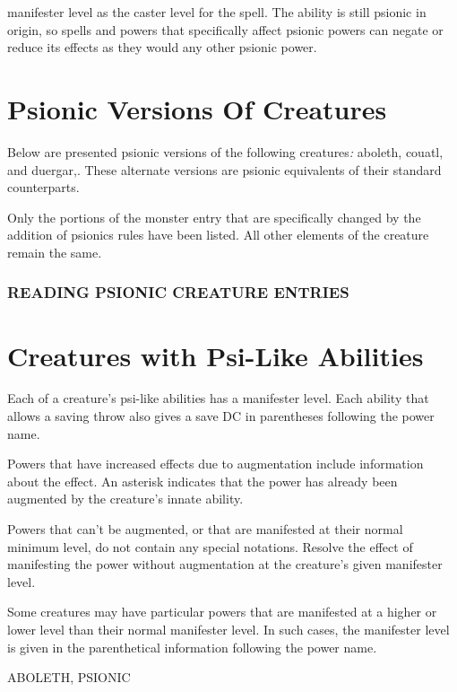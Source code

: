 \documentclass{article}
\begin{document}
manifester level as the caster level for the spell. The ability is still psionic 
in origin, so spells and powers that specifically affect psionic powers can negate 
or reduce its effects as they would any other psionic power.

\vspace{12pt}
\section*{\textbf{Psionic Versions Of Creatures}}

Below are presented psionic versions of the following creatures\textit{: }aboleth, 
couatl, and duergar,. These alternate versions are psionic equivalents of their 
standard counterparts.

Only the portions of the monster entry that are specifically changed by the addition 
of psionics rules have been listed.  All other elements of the creature remain 
the same.

\vspace{12pt}
\subsubsection*{READING PSIONIC CREATURE ENTRIES}

\section*{\textbf{Creatures with Psi-Like Abilities}}

Each of a creature's psi-like abilities has a manifester level. Each ability that 
allows a saving throw also gives a save DC in parentheses following the power name.

Powers that have increased effects due to augmentation include information about 
the effect. An asterisk indicates that the power has already been augmented by 
the creature's innate ability.

Powers that can't be augmented, or that are manifested at their normal minimum 
level, do not contain any special notations. Resolve the effect of manifesting 
the power without augmentation at the creature's given manifester level.

Some creatures may have particular powers that are manifested at a higher or lower 
level than their normal manifester level. In such cases, the manifester level is 
given in the parenthetical information following the power name.

\vspace{12pt}
{\LARGE{}ABOLETH, PSIONIC}
\end{document}
